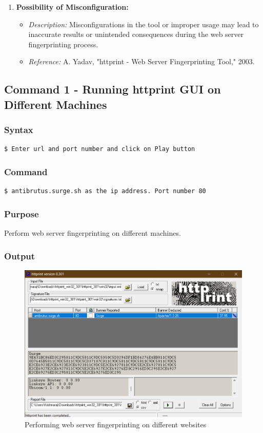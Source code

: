 \documentclass[11pt]{article}
\begin{document}
\begin{enumerate}
    \item \textbf{Possibility of Misconfiguration:}
    \begin{itemize}
        \item \textit{Description:} Misconfigurations in the tool or improper usage may lead to inaccurate results or unintended consequences during the web server fingerprinting process.
        \item \textit{Reference:} A. Yadav, "httprint - Web Server Fingerprinting Tool," 2003.
    \end{itemize}
\end{enumerate}


\subsection{Command 1 - Running httprint GUI on Different Machines}

\subsubsection*{Syntax}
\begin{verbatim}
$ Enter url and port number and click on Play button
\end{verbatim}

\subsubsection*{Command}
\begin{verbatim}
$ antibrutus.surge.sh as the ip address. Port number 80
\end{verbatim}

\subsubsection*{Purpose}
Perform web server fingerprinting on different machines.

\subsubsection*{Output}

\begin{figure}[H]
    \centering
    \includegraphics[height=0.5\textwidth]{httprint/httprint on antibrutus.png}
    \caption{Performing web server fingerprinting on different websites}
\end{figure}
\end{document}
